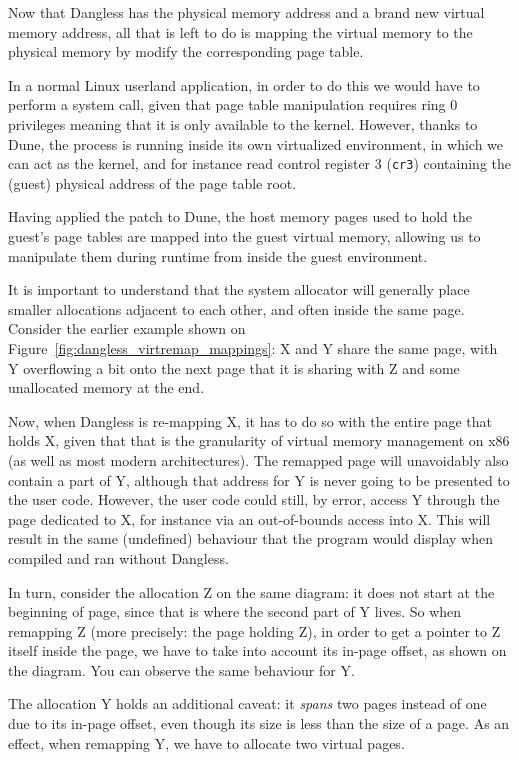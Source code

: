 Now that Dangless has the physical memory address and a brand new virtual memory address, all that is left to do is mapping the virtual memory to the physical memory by modify the corresponding page table.

In a normal Linux userland application, in order to do this we would have to perform a system call, given that page table manipulation requires ring 0 privileges meaning that it is only available to the kernel. However, thanks to Dune, the process is running inside its own virtualized environment, in which we can act as the kernel, and for instance read control register 3 (\lstinline!cr3!) containing the (guest) physical address of the page table root.

Having applied the  patch to Dune, the host memory pages used to hold the guest's page tables are mapped into the guest virtual memory, allowing us to manipulate them during runtime from inside the guest environment.

It is important to understand that the system allocator will generally place smaller allocations adjacent to each other, and often inside the same page. Consider the earlier example shown on Figure~\ref{fig:dangless_virtremap_mappings}: X and Y share the same page, with Y overflowing a bit onto the next page that it is sharing with Z and some unallocated memory at the end.

Now, when Dangless is re-mapping X, it has to do so with the entire page that holds X, given that that is the granularity of virtual memory management on x86 (as well as most modern architectures). The remapped page will unavoidably also contain a part of Y, although that address for Y is never going to be presented to the user code. However, the user code could still, by error, access Y through the page dedicated to X, for instance via an out-of-bounds access into X. This will result in the same (undefined) behaviour that the program would display when compiled and ran without Dangless.

In turn, consider the allocation Z on the same diagram: it does not start at the beginning of page, since that is where the second part of Y lives. So when remapping Z (more precisely: the page holding Z), in order to get a pointer to Z itself inside the page, we have to take into account its in-page offset, as shown on the diagram. You can observe the same behaviour for Y.

The allocation Y holds an additional caveat: it \emph{spans} two pages instead of one due to its in-page offset, even though its size is less than the size of a page. As an effect, when remapping Y, we have to allocate two virtual pages.

